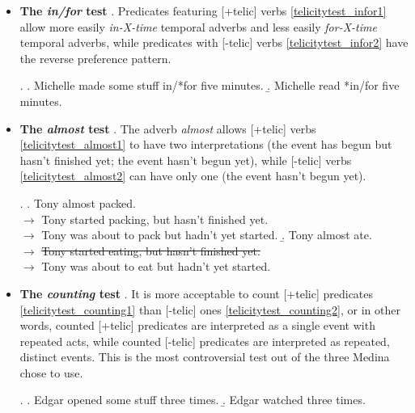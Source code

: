 \begin{itemize}
    \item \textbf{The \textit{in/for} test} \parencite{dowty2012word1979, Vendler1957}. Predicates featuring [+telic] verbs \ref{telicitytest_infor1} allow more easily \textit{in-X-time} temporal adverbs and less easily \textit{for-X-time} temporal adverbs, while predicates with [-telic] verbs \ref{telicitytest_infor2} have the reverse preference pattern.
    
\ex. \label{telicitytest_infor} \a. \label{telicitytest_infor1} Michelle made some stuff in/*for five minutes.
\b. \label{telicitytest_infor2}  Michelle read *in/for five minutes.
    
    \item \textbf{The \textit{almost} test} \parencite{dowty2012word1979}. The adverb \textit{almost} allows [+telic] verbs \ref{telicitytest_almost1} to have two interpretations (the event has begun but hasn't finished yet; the event hasn't begun yet), while [-telic] verbs \ref{telicitytest_almost2} can have only one (the event hasn't begun yet).
    
\ex. \label{telicitytest_almost} \a. \label{telicitytest_almost1} Tony almost packed.\\ $\longrightarrow$  Tony started packing, but hasn’t finished yet. \\ $\longrightarrow$  Tony was about to pack but hadn’t yet started.
\b. \label{telicitytest_almost2} Tony almost ate.\\ $\longrightarrow$  \sout{Tony started eating, but hasn’t finished yet.} \\ $\longrightarrow$  Tony was about to eat but hadn’t yet started.
    
    \item \textbf{The \textit{counting} test} \parencite{bach1986algebra}. It is more acceptable to count [+telic] predicates \ref{telicitytest_counting1} than [-telic] ones \ref{telicitytest_counting2}, or in other words, counted [+telic] predicates are interpreted as a single event with repeated acts, while counted [-telic] predicates are interpreted as repeated, distinct events. This is the most controversial test out of the three Medina chose to use.

\ex. \label{telicitytest_counting} \a. \label{telicitytest_counting1} Edgar opened some stuff three times.
\b. \label{telicitytest_counting2}  Edgar watched three times.

\end{itemize}

